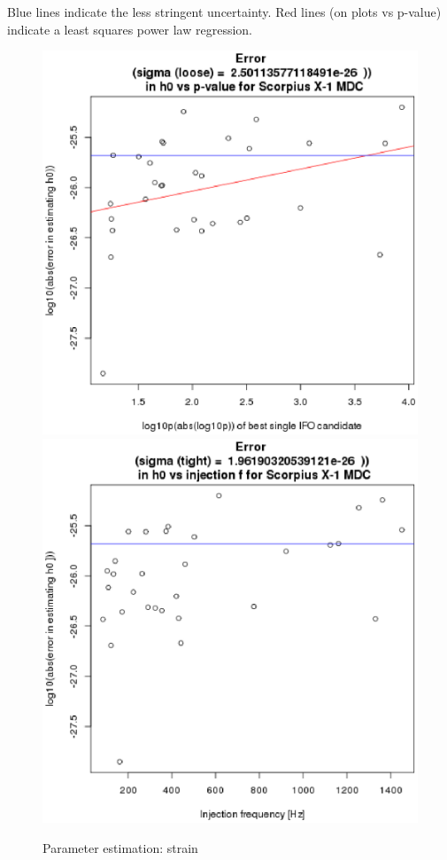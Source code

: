 Blue lines indicate the less stringent uncertainty. Red lines (on plots vs p-value) indicate a least squares power law regression.

\begin{figure}
\begin{center}
\includegraphics[width=0.3\paperwidth,height=0.2\paperheight]{Errorh0.eps}
\includegraphics[width=0.3\paperwidth,height=0.2\paperheight]{Errorh0vsF.eps}
\caption{Parameter estimation: strain
}
\end{center}
\end{figure}


